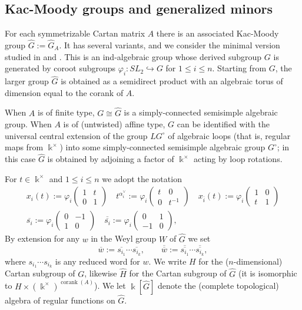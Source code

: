 \documentclass[12pt]{amsart}
\newcommand{\sayHW}[1]{\say[HW]{\color{violet}{\bf HW:}\;#1}}
\newcommand{\sayDR}[1]{\say[DR]{\color{red}{\bf DR:}\;#1}}
\newcommand{\kk}{\Bbbk}%
\newcommand\into{\hookrightarrow}
\DeclareMathOperator{\corank}{corank}
\newcommand{\ol}[1]{\overline{#1}}
\newcommand{\dol}[1]{\overline{\overline{#1}}}
\theoremstyle{remark}
\numberwithin{equation}{section}
\numberwithin{figure}{section}
\begin{document}
\subsection{Kac-Moody groups and generalized minors}

For each symmetrizable Cartan matrix $A$ there is an associated Kac-Moody group $\widehat{G}:=\widehat{G}_A$. 
It has several variants, and we consider the minimal version studied in \cite{KP83} and \cite[Sec. 7.4]{Kum02}. 
This is an ind-algebraic group whose derived subgroup $G$ is generated by coroot subgroups $\varphi_i: SL_2 \into G$ for $1 \leq i \leq n$. Starting from $G$, the larger group $\widehat{G}$ is obtained as a semidirect product with an algebraic torus of dimension equal to the corank of $A$.


When $A$ is of finite type, $G \cong \widehat{G}$ is a simply-connected semisimple algebraic group. When $A$ is of (untwisted) affine type, $G$ can be identified with the universal central extension of the group $LG^\circ$ of algebraic loops (that is, regular maps from $\kk^\times$) into some simply-connected semisimple algebraic group $G^\circ$; in this case $\widehat{G}$ is obtained by adjoining a factor of $\kk^\times$ acting by loop rotations.


For $t \in \kk^\times$ and $1 \leq i \leq n$ we adopt the notation 
\begin{gather}
x_{i}(t):=\varphi_i\begin{pmatrix} 1 & t \\ 0 & 1\end{pmatrix} \quad  
t^{\alpha_i^\vee}:=\varphi_i\begin{pmatrix}t & 0 \\ 0 & t^{-1}\end{pmatrix} \quad
x_{\ol{i}}(t):=\varphi_i\begin{pmatrix} 1 & 0 \\ t & 1\end{pmatrix} \\
\ol{s_{i}} := \varphi_i \begin{pmatrix} 0 & -1 \\ 1 & 0 \end{pmatrix} \quad
\dol{s_{i}} := \varphi_i \begin{pmatrix} 0 & 1 \\ -1 & 0 \end{pmatrix},
\end{gather}%
By extension for any $w$ in the Weyl group $W$ of $\widehat{G}$ we set \[\ol{w} := \ol{s_{i_1}}\cdots\ol{s_{i_k}}, \quad \quad \dol{w} := \dol{s_{i_1}}\cdots\dol{s_{i_k}},\] where $s_{i_1}\cdots s_{i_k}$ is any reduced word for $w$. 
We write $H$ for the ($n$-dimensional) Cartan subgroup of $G$, likewise $\widehat{H}$ for the Cartan subgroup of $\widehat{G}$ (it is isomorphic to $H \times (\kk^\times)^{\corank(A)}$). We let $\kk[\widehat{G}]$ denote the (complete topological) algebra of regular functions on $\widehat{G}$.
\end{document}
